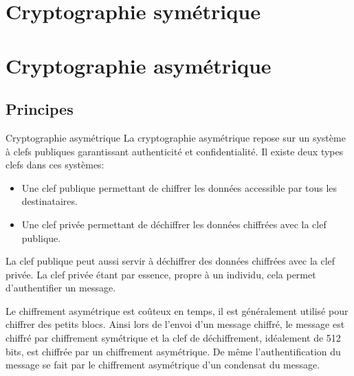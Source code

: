 \documentclass[twoside,a4paper,12pt,titlepage]{book}
\begin{document}
\section{Cryptographie symétrique}
\section{Cryptographie asymétrique}
\subsection{Principes}
\begin{Define}{Cryptographie asymétrique}
La cryptographie asymétrique repose sur un système à clefs publiques garantissant authenticité et confidentialité. Il existe deux types clefs dans ces systèmes:\begin{itemize}
\item Une clef publique permettant de chiffrer les données accessible par tous les destinataires.
\item Une clef privée permettant de déchiffrer les données chiffrées avec la clef publique.
\end{itemize}
La clef publique peut aussi servir à déchiffrer des données chiffrées avec la clef privée. La clef privée étant par essence, propre à un individu, cela permet d'authentifier un message.
\end{Define}
\begin{Warning}
Le chiffrement asymétrique est coûteux en temps, il est généralement utilisé pour chiffrer des petits blocs. Ainsi lors de l'envoi d'un message chiffré, le message est chiffré par chiffrement symétrique et la clef de déchiffrement, idéalement de 512 bits, est chiffrée par un chiffrement asymétrique. De même l'authentification du message se fait par le chiffrement asymétrique d'un condensat du message.
\end{Warning}
\end{document}
